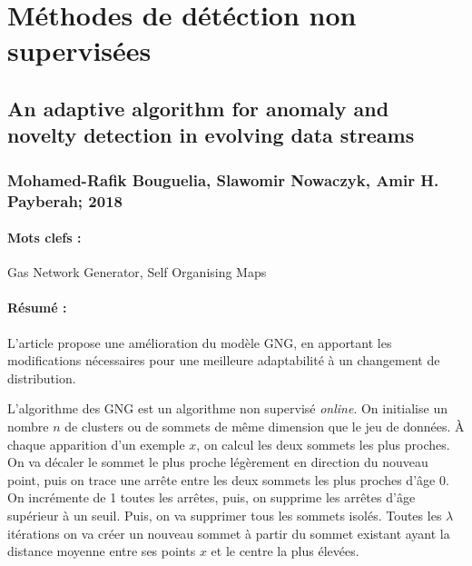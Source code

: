 \documentclass[11pt,a4paper]{report}
\begin{document}
\newpage



















\section{Méthodes de détéction non supervisées}

\subsection{An adaptive algorithm for anomaly and novelty detection in evolving data streams}
\subsubsection{Mohamed-Rafik Bouguelia, Slawomir Nowaczyk, Amir H. Payberah; 2018}

\paragraph{Mots clefs :}Gas Network Generator, Self Organising Maps

\paragraph{Résumé :}L'article propose une amélioration du modèle GNG, en apportant les modifications nécessaires pour une meilleure adaptabilité à un changement de distribution.

L'algorithme des GNG est un algorithme non supervisé \textit{online}. On initialise un nombre $n$ de clusters ou de sommets de même dimension que le jeu de données. À chaque apparition d'un exemple $x$, on calcul les deux sommets les plus proches. On va décaler le sommet le plus proche légèrement en direction du nouveau point, puis on trace une arrête entre les deux sommets les plus proches d'âge 0. On incrémente de 1 toutes les arrêtes, puis, on supprime les arrêtes d'âge supérieur à un seuil. Puis, on va supprimer tous les sommets isolés. Toutes les $\lambda$ itérations on va créer un nouveau sommet à partir du sommet existant ayant la distance moyenne entre ses points $x$ et le centre la plus élevées.
\end{document}
